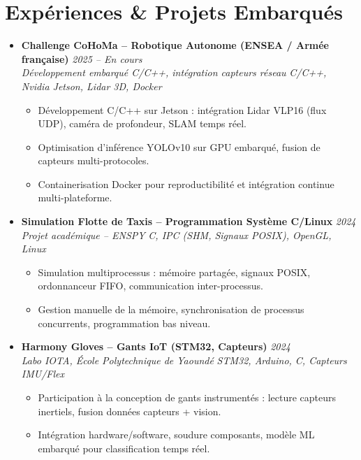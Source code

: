 \documentclass[a4paper,11pt]{article}
\begin{document}
\section{Expériences \& Projets Embarqués}
\begin{itemize}[leftmargin=*, label={-}]

\item \textbf{Challenge CoHoMa -- Robotique Autonome (ENSEA / Armée française)} \hfill \textit{2025 -- En cours} \\
\textit{Développement embarqué C/C++, intégration capteurs réseau} \hfill \textit{C/C++, Nvidia Jetson, Lidar 3D, Docker}
\vspace{-2pt}
    \begin{itemize}[leftmargin=0.4cm, nosep, label=\tiny$\bullet$]
        \item \small{Développement C/C++ sur Jetson : intégration Lidar VLP16 (flux UDP), caméra de profondeur, SLAM temps réel.}
        \item \small{Optimisation d'inférence YOLOv10 sur GPU embarqué, fusion de capteurs multi-protocoles.}
        \item \small{Containerisation Docker pour reproductibilité et intégration continue multi-plateforme.}
    \end{itemize}
\vspace{3pt}

\item \textbf{Simulation Flotte de Taxis -- Programmation Système C/Linux} \hfill \textit{2024} \\
\textit{Projet académique -- ENSPY} \hfill \textit{C, IPC (SHM, Signaux POSIX), OpenGL, Linux}
\vspace{-2pt}
    \begin{itemize}[leftmargin=0.4cm, nosep, label=\tiny$\bullet$]
        \item \small{Simulation multiprocessus : mémoire partagée, signaux POSIX, ordonnanceur FIFO, communication inter-processus.}
        \item \small{Gestion manuelle de la mémoire, synchronisation de processus concurrents, programmation bas niveau.}
    \end{itemize}
\vspace{3pt}

\item \textbf{Harmony Gloves -- Gants IoT (STM32, Capteurs)} \hfill \textit{2024} \\
\textit{Labo IOTA, École Polytechnique de Yaoundé} \hfill \textit{STM32, Arduino, C, Capteurs IMU/Flex}
\vspace{-2pt}
    \begin{itemize}[leftmargin=0.4cm, nosep, label=\tiny$\bullet$]
        \item \small{Participation à la conception de gants instrumentés : lecture capteurs inertiels, fusion données capteurs + vision.}
        \item \small{Intégration hardware/software, soudure composants, modèle ML embarqué pour classification temps réel.}
    \end{itemize}
\vspace{3pt}


\end{itemize}
\end{document}
